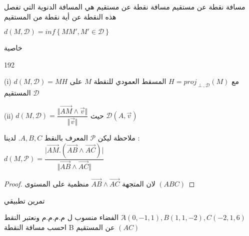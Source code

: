 \begin{frame}%
	\begin{block}{ مسافة نقطة عن مستقيم}
	مسافة  نقطة عن مستقيم هي المسافة الدنوية 
	التي تفصل هذه النقطة  عن أية نقطة من  المستقيم  
	
		  $d(M,\mathcal{D})=inf\left\lbrace MM', M' \in \mathcal{D}\right\rbrace $
	\end{block}
	\begin{block}{ خاصية}
		\begin{dingautolist}{192}
			\item 	(i) $d(M,\mathcal{D})=MH$ 
			مع
			 $H=proj_{\perp,\mathcal{D}}(M)$
			 المسقط العمودي للنقطة  
			 $ M $
			 على المستقيم
			 $  \mathcal{D} $
			\item 	(ii) $d(M,\mathcal{D})=\dfrac{\Vert \overrightarrow{AM} \wedge \overrightarrow{v}\Vert}{\Vert \overrightarrow{v} \Vert}$ 
			حيث
			 $\mathcal{D}(A,\overrightarrow{v})$
		\end{dingautolist}
	\end{block}
\end{frame}	

\begin{frame}

	\begin{block}{ملاحظة }
		ليكن
		 $\mathcal{P}$ 
		 المعرف بالنقط
		  $A,B,C$. 
		  لدينا
		   :\\
			$d(M,\mathcal{P})=\dfrac{\vert \overrightarrow{AM}.(\overrightarrow{AB} \wedge \overrightarrow{AC}) \vert}{\Vert \overrightarrow{AB} \wedge \overrightarrow{AC} \Vert}$
	\end{block}
	\pause
	\begin{proof}
	لان  المتجهة 
	 $\overrightarrow{AB}\wedge\overrightarrow{AC}$ 
	 منظمية على المستوى 
	 $ (ABC) $
	\end{proof}
\end{frame}
\begin{frame}[label=ex4]{تمرين تطبيقي}%
	\begin{exo}
		الفضاء منسوب ل م.م.م.م ونعتبر النقط 
		$ َA(0,-1,1),B(1,1,-2),C(-2,1,6)  $
		\\
		احسب مسافة النقطة B عن المستقيم $ (AC) $
	
		\hyperlink{sol4}{}
	\end{exo}
\hyperlink{sol4}{}
\end{frame}


